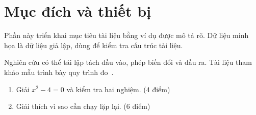 \section{Mục đích và thiết bị}


\label{sec:chapter1}
Phần này triển khai mục tiêu tài liệu bằng ví dụ được mô tả rõ. Dữ liệu minh họa là dữ liệu giả lập, dùng để kiểm tra cấu trúc tài liệu.

Nghiên cứu có thể tái lập tách đầu vào, phép biến đổi và đầu ra. Tài liệu tham khảo mẫu trình bày quy trình đo~\cite{example}.
\begin{enumerate}
\item Giải $x^2-4=0$ và kiểm tra hai nghiệm. (4 điểm)
\item Giải thích vì sao cần chạy lặp lại. (6 điểm)
\end{enumerate}
